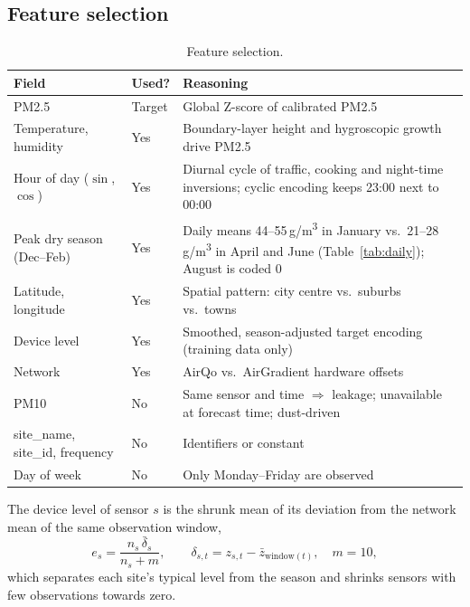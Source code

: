 \documentclass[11pt,a4paper]{article}
\newcommand{\ugm}{\,\textmu g/m\textsuperscript{3}}
\begin{document}
\subsection{Feature selection}
\begin{table}[H]
\centering\small
\caption{Feature selection.}
\label{tab:features}
\begin{tabularx}{\textwidth}{L{4.2cm}L{1.2cm}Y}
\toprule
Field & Used? & Reasoning \\
\midrule
PM2.5 & Target & Global Z-score of calibrated PM2.5 \\
Temperature, humidity & Yes & Boundary-layer height and hygroscopic growth drive PM2.5 \\
Hour of day ($\sin$, $\cos$) & Yes & Diurnal cycle of traffic, cooking and night-time inversions; cyclic encoding keeps 23:00 next to 00:00 \\
Peak dry season (Dec--Feb) & Yes & Daily means 44--55\ugm{} in January vs.\ 21--28\ugm{} in April and June (Table~\ref{tab:daily}); August is coded 0 \\
Latitude, longitude & Yes & Spatial pattern: city centre vs.\ suburbs vs.\ towns \\
Device level & Yes & Smoothed, season-adjusted target encoding (training data only) \\
Network & Yes & AirQo vs.\ AirGradient hardware offsets \\
PM10 & No & Same sensor and time $\Rightarrow$ leakage; unavailable at forecast time; dust-driven \\
site\_name, site\_id, frequency & No & Identifiers or constant \\
Day of week & No & Only Monday--Friday are observed \\
\bottomrule
\end{tabularx}
\end{table}

The device level of sensor $s$ is the shrunk mean of its deviation from the network mean of the same observation window,
\begin{equation}
e_s = \frac{n_s\,\bar{\delta}_s}{n_s + m}, \qquad \delta_{s,t} = z_{s,t} - \bar{z}_{\text{window}(t)}, \quad m = 10 ,
\end{equation}
which separates each site's typical level from the season and shrinks sensors with few observations towards zero.
\end{document}
